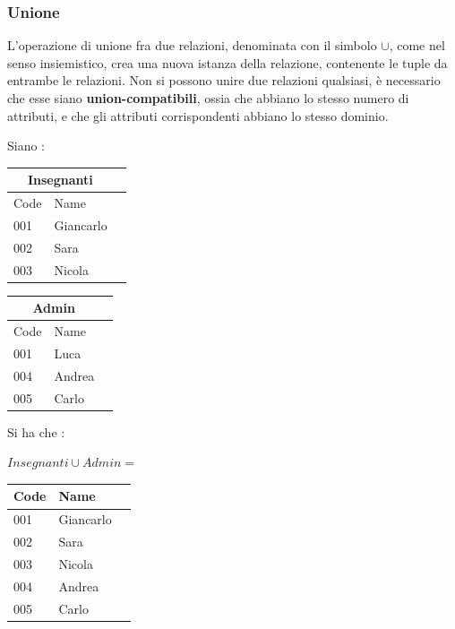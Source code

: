 \documentclass[12pt, letterpaper]{article}
\begin{document}
    \subsubsection{Unione}
L'operazione di unione fra due relazioni, denominata con il simbolo \(\cup\), come nel senso insiemistico, crea una nuova istanza 
della relazione, contenente le tuple da entrambe le relazioni. Non si possono unire due relazioni 
qualsiasi, è necessario che esse siano \textbf{union-compatibili}, ossia che abbiano lo stesso 
numero di attributi, e che gli attributi corrispondenti abbiano lo stesso dominio.
\begin{center}
    Siano : 
    \begin{tabular}{|l|l|r|}
        \hline
    \multicolumn{2}{|c|}{\textbf{Insegnanti}}\\
        \hline
        Code & Name  \\
        \hline
        \color{blue}001 & \color{blue}Giancarlo  \\
        \hline
        002 & Sara  \\
        \hline
        003 & Nicola\\
        \hline
        \end{tabular}
        \begin{tabular}{|l|l|r|}
            \hline
        \multicolumn{2}{|c|}{\textbf{Admin}}\\
            \hline
            Code & Name  \\
            \hline
            \color{red}001 & \color{red}Luca  \\
            \hline
            004 & Andrea  \\
            \hline
            005 & Carlo\\
            \hline
            \end{tabular}
 Si ha che :\end{center}\begin{center}
\(Insegnanti\cup Admin = \)
\begin{tabular}{|l|l|r|}
    \hline
    Code & Name  \\
    \hline
    \color{blue}001 & \color{blue}Giancarlo  \\
    \hline
    002 & Sara  \\
    \hline
    003 & Nicola\\
    \hline
    004 & Andrea  \\
    \hline
    005 & Carlo\\
    \hline
    \end{tabular} \end{center}
\end{document}
